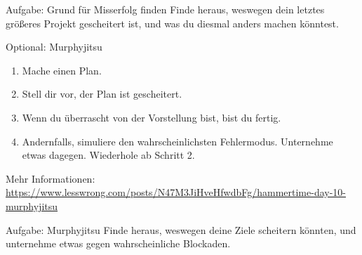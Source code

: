 \begin{frame}[c]
    \begin{block}{Aufgabe: Grund für Misserfolg finden}
        Finde heraus, weswegen dein letztes größeres Projekt gescheitert ist,
        und was du diesmal anders machen könntest.
    \end{block}
\end{frame}


\begin{frame}[c]{Optional: Murphyjitsu}
    \large
    \begin{enumerate}[<+(1)->]
        \item Mache einen Plan.
        \item Stell dir vor, der Plan ist gescheitert.
        \item Wenn du überrascht von der Vorstellung bist, bist du fertig.
        \item Andernfalls, simuliere den wahrscheinlichsten Fehlermodus. Unternehme etwas dagegen. Wiederhole ab Schritt 2.
    \end{enumerate}
    \pause
    \tiny
    Mehr Informationen: \url{https://www.lesswrong.com/posts/N47M3JiHveHfwdbFg/hammertime-day-10-murphyjitsu}
\end{frame}


\begin{frame}[c]
    \begin{block}{Aufgabe: Murphyjitsu}
        Finde heraus, weswegen deine Ziele scheitern könnten, und unternehme
        etwas gegen wahrscheinliche Blockaden.
    \end{block}
\end{frame}


